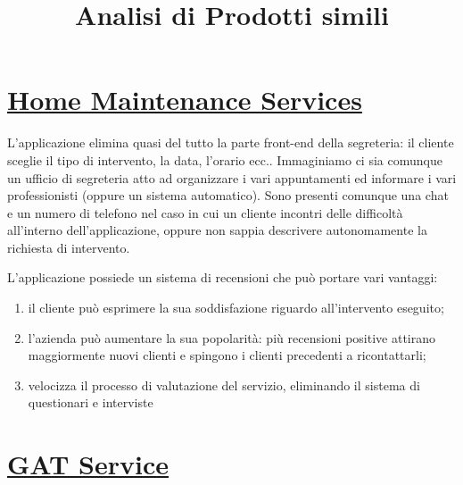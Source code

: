 \documentclass[11pt]{article}
\begin{document}
\author{}
\title{Analisi di Prodotti simili}
\maketitle

\section{\href{https://www.searshomeservices.com/}{Home Maintenance Services}}

L’applicazione elimina quasi del tutto la parte front-end della
segreteria: il cliente sceglie il tipo di intervento, la data,
l’orario ecc.. Immaginiamo ci sia comunque un ufficio di segreteria
atto ad organizzare i vari appuntamenti ed informare i vari
professionisti (oppure un sistema automatico).  Sono presenti comunque
una chat e un numero di telefono nel caso in cui un cliente incontri
delle difficoltà all’interno dell’applicazione, oppure non sappia
descrivere autonomamente la richiesta di intervento.

L’applicazione possiede un sistema di recensioni che può portare vari vantaggi:

\begin{enumerate}
  \item il cliente può esprimere la sua soddisfazione riguardo all’intervento eseguito;
  \item l’azienda può aumentare la sua popolarità: più recensioni positive attirano maggiormente nuovi clienti e spingono i clienti precedenti a ricontattarli;
  \item velocizza il processo di valutazione del servizio, eliminando il sistema di questionari e interviste
\end{enumerate}

\section{\href{https://www.rcsoft.it/software-assistenza-tecnica-gat/}{GAT Service}}
\end{document}
